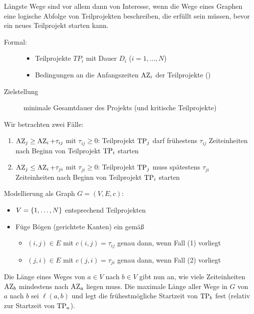 Längste Wege sind vor allem dann von Interesse, wenn die Wege eines Graphen eine logische Abfolge von Teilprojekten beschreiben, die erfüllt sein müssen, bevor ein neues Teilprojekt starten kann.

\begin{description}
	\item[Formal:]
	\begin{itemize}[nolistsep, topsep=-\parskip]
		\item Teilprojekte $TP_i$ mit Dauer $D_i$ ($i = 1, \dots, N$)
		\item Bedingungen an die Anfangszeiten $\operatorname{AZ}_i$ der Teilprojekte ()
	\end{itemize}
	\item[Zielstellung] minimale Gesamtdauer des Projekts (und kritische Teilprojekte)
\end{description}

Wir betrachten zwei Fälle:
\begin{enumerate}[label=(\arabic*), nolistsep]
	\item $\operatorname{AZ}_j \ge \operatorname{AZ}_i + \tau_{ij}$ mit $\tau_{ij} \ge 0$: Teilprojekt $\operatorname{TP}_j$ darf frühestens $\tau_{ij}$ Zeiteinheiten nach Beginn von Teilprojekt $\operatorname{TP}_i$ starten
	\item $\operatorname{AZ}_j \le \operatorname{AZ}_i + \tau_{ji}$ mit $\tau_{ji} \ge 0$: Teilprojekt $\operatorname{TP}_j$ muss spätestens $\tau_{ji}$ Zeiteinheiten nach Beginn von Teilprojekt $\operatorname{TP}_i$ starten
\end{enumerate}

Modellierung als Graph $G = (V,E,c)$:

\begin{itemize}[nolistsep, topsep=-\parskip]
	\item $V = \left\{ 1, \dots, N \right\}$ entsprechend Teilprojekten
	\item Füge Bögen (gerichtete Kanten) ein gemäß
	\begin{itemize}
		\item $(i,j) \in E$ mit $c(i,j) = \tau_{ij}$ genau dann, wenn Fall (1) vorliegt
		\item $(j,i) \in E$ mit $c(j,i) = \tau_{ji}$ genau dann, wenn Fall (2) vorliegt
	\end{itemize}
\end{itemize}

Die Länge eines Weges von $a \in V$ nach $b \in V$ gibt nun an, wie viele Zeiteinheiten $\operatorname{AZ}_b$ mindestens nach $\operatorname{AZ}_a$ liegen muss. Die maximale Länge aller Wege in $G$ von $a$ nach $b$ sei $\ell(a,b)$ und legt die frühestmögliche Startzeit von $\operatorname{TP}_b$ fest (relativ zur Startzeit von $\operatorname{TP}_a$).

